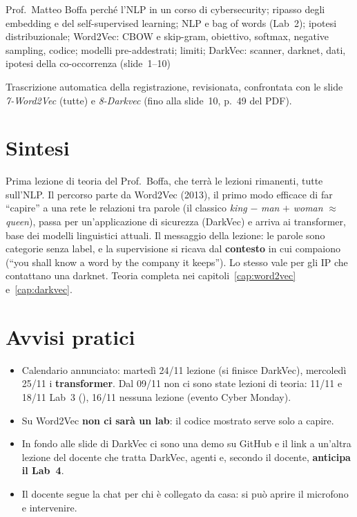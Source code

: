   {Prof.~Matteo Boffa}
  {perché l'NLP in un corso di cybersecurity; ripasso degli embedding e del self-supervised learning;
   NLP e bag of words (Lab~2); ipotesi distribuzionale; Word2Vec: CBOW e skip-gram, obiettivo, softmax,
   negative sampling, codice; modelli pre-addestrati; limiti; DarkVec: scanner, darknet, dati, ipotesi
   della co-occorrenza (slide~1--10)}
\label{lez:2026-11-23}

\begin{nota}[Fonte]
Trascrizione automatica della registrazione, revisionata, confrontata con le slide \emph{7-Word2Vec}
(tutte) e \emph{8-Darkvec} (fino alla slide~10, p.~49 del PDF).
\end{nota}

\section{Sintesi}
Prima lezione di teoria del Prof.~Boffa, che terrà le lezioni rimanenti, tutte sull'NLP. Il percorso parte da
Word2Vec (2013), il primo modo efficace di far ``capire'' a una rete le relazioni tra parole (il classico
\emph{king} $-$ \emph{man} $+$ \emph{woman} $\approx$ \emph{queen}), passa per un'applicazione di sicurezza
(DarkVec) e arriva ai transformer, base dei modelli linguistici attuali. Il messaggio della lezione: le
parole sono categorie senza label, e la supervisione si ricava dal \textbf{contesto} in cui compaiono (``you
shall know a word by the company it keeps''). Lo stesso vale per gli IP che contattano una darknet. Teoria
completa nei capitoli~\ref{cap:word2vec} e~\ref{cap:darkvec}.

\section{Avvisi pratici}
\begin{itemize}
  \item Calendario annunciato: martedì 24/11 lezione (si finisce DarkVec), mercoledì 25/11 i
        \textbf{transformer}. Dal 09/11 non ci sono state lezioni di teoria: 11/11 e 18/11 Lab~3
        (), 16/11 nessuna lezione (evento Cyber Monday).
  \item Su Word2Vec \textbf{non ci sarà un lab}: il codice mostrato serve solo a capire.
  \item In fondo alle slide di DarkVec ci sono una demo su GitHub e il link a un'altra lezione del docente
        che tratta DarkVec, agenti e, secondo il docente, \textbf{anticipa il Lab~4}.
  \item Il docente segue la chat per chi è collegato da casa: si può aprire il microfono e intervenire.
\end{itemize}

